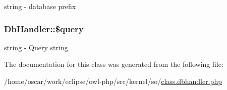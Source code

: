 string - database prefix \hypertarget{classDbHandler_d671b5596b37dac6d48a660a07775965}{
\subsubsection{\setlength{\rightskip}{0pt plus 5cm}DbHandler::\$query}}
\label{classDbHandler_d671b5596b37dac6d48a660a07775965}


string - Query string 

The documentation for this class was generated from the following file:\begin{CompactItemize}
\item 
/home/oscar/work/eclipse/owl-php/src/kernel/so/\hyperlink{class_8dbhandler_8php}{class.dbhandler.php}\end{CompactItemize}

